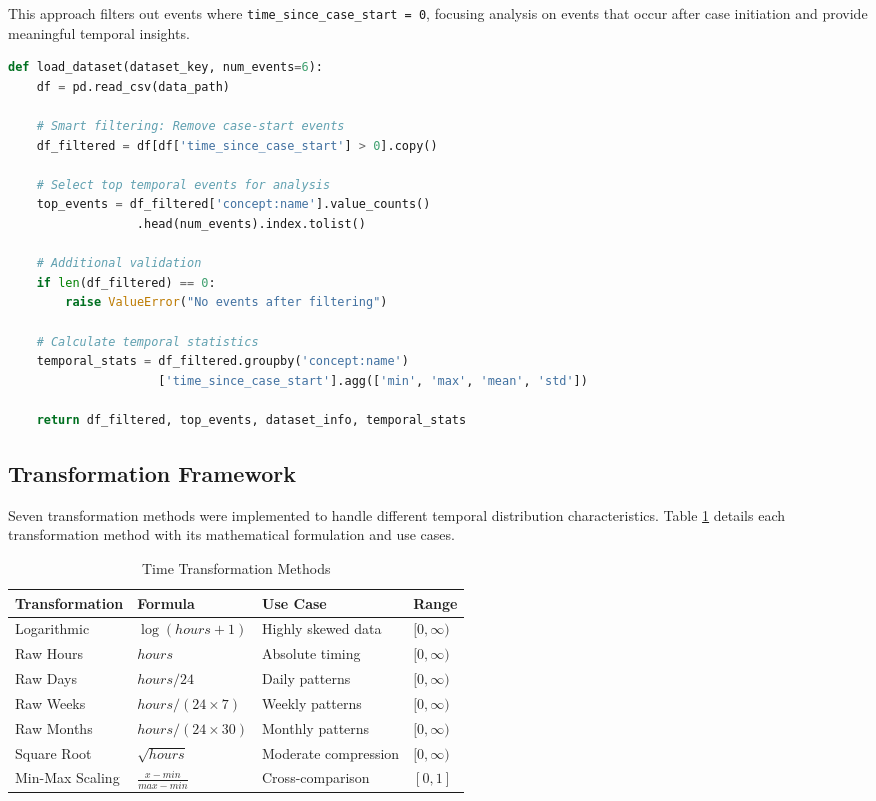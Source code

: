 \documentclass[11pt,a4paper]{article}
\begin{document}
This approach filters out events where \texttt{time\_since\_case\_start = 0}, focusing analysis on events that occur after case initiation and provide meaningful temporal insights.

\begin{lstlisting}[language=Python, caption=Smart Filtering Implementation]
def load_dataset(dataset_key, num_events=6):
    df = pd.read_csv(data_path)
    
    # Smart filtering: Remove case-start events
    df_filtered = df[df['time_since_case_start'] > 0].copy()
    
    # Select top temporal events for analysis
    top_events = df_filtered['concept:name'].value_counts()
                  .head(num_events).index.tolist()
    
    # Additional validation
    if len(df_filtered) == 0:
        raise ValueError("No events after filtering")
    
    # Calculate temporal statistics
    temporal_stats = df_filtered.groupby('concept:name')
                     ['time_since_case_start'].agg(['min', 'max', 'mean', 'std'])
    
    return df_filtered, top_events, dataset_info, temporal_stats
\end{lstlisting}

\subsection{Transformation Framework}

Seven transformation methods were implemented to handle different temporal distribution characteristics. Table \ref{tab:transformations} details each transformation method with its mathematical formulation and use cases.

\begin{table}[H]
\centering
\caption{Time Transformation Methods}
\label{tab:transformations}
\begin{tabular}{@{}llll@{}}
\toprule
\textbf{Transformation} & \textbf{Formula} & \textbf{Use Case} & \textbf{Range} \\
\midrule
Logarithmic & $\log(hours + 1)$ & Highly skewed data & $[0, \infty)$ \\
Raw Hours & $hours$ & Absolute timing & $[0, \infty)$ \\
Raw Days & $hours / 24$ & Daily patterns & $[0, \infty)$ \\
Raw Weeks & $hours / (24 \times 7)$ & Weekly patterns & $[0, \infty)$ \\
Raw Months & $hours / (24 \times 30)$ & Monthly patterns & $[0, \infty)$ \\
Square Root & $\sqrt{hours}$ & Moderate compression & $[0, \infty)$ \\
Min-Max Scaling & $\frac{x - min}{max - min}$ & Cross-comparison & $[0, 1]$ \\
\bottomrule
\end{tabular}
\end{table}
\end{document}
